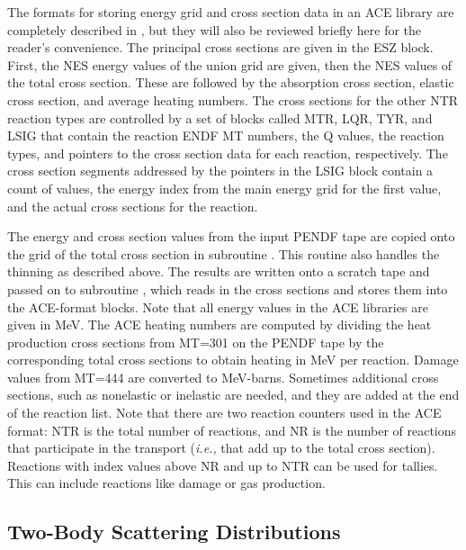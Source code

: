 The formats for storing energy grid and cross section data in an ACE
library are completely described in \cite{ACEFormat}, 
but they will also be reviewed briefly here for the
reader's convenience.  The principal cross sections are given in the
ESZ block.  First, the NES energy values of the union grid are given,
then the NES values of the total cross section.  These are followed
by the absorption cross section, elastic cross section, and average
heating numbers.  The cross sections for the other NTR reaction types
are controlled by a set of blocks called MTR, LQR, TYR, and LSIG that
contain the reaction ENDF MT numbers, the Q values, the reaction
types, and pointers to the cross section data for each reaction,
respectively.  The cross section segments addressed by the pointers in
the LSIG block contain a count of values, the energy index from the
main energy grid for the first value, and the actual cross sections
for the reaction.

The energy and cross section values from the input PENDF tape are
copied onto the grid of the total cross section in subroutine
 .  This routine also
handles the thinning as described above.  The results are written
onto a scratch tape and passed on to subroutine
, which reads in the
cross sections and stores them into the ACE-format blocks.  Note
that all energy values in the ACE libraries are given in MeV.  The
ACE heating numbers are computed by dividing the heat production
cross sections from MT=301 on the PENDF tape by the corresponding
total cross sections to obtain heating in MeV per reaction.  Damage
values from MT=444 are converted to MeV-barns.  Sometimes additional
cross sections, such as nonelastic or inelastic are needed, and
they are added at the end of the reaction list.  Note that there
are two reaction counters used in the ACE format: NTR is the total
number of reactions, and NR is the number of reactions that
participate in the transport ({\it i.e.,} that add up to the
total cross section).  Reactions with index values above NR and
up to NTR can be used for tallies.  This can include reactions like
damage or gas production.

\subsection{Two-Body Scattering Distributions}
\label{ssACER_2body_scat}

